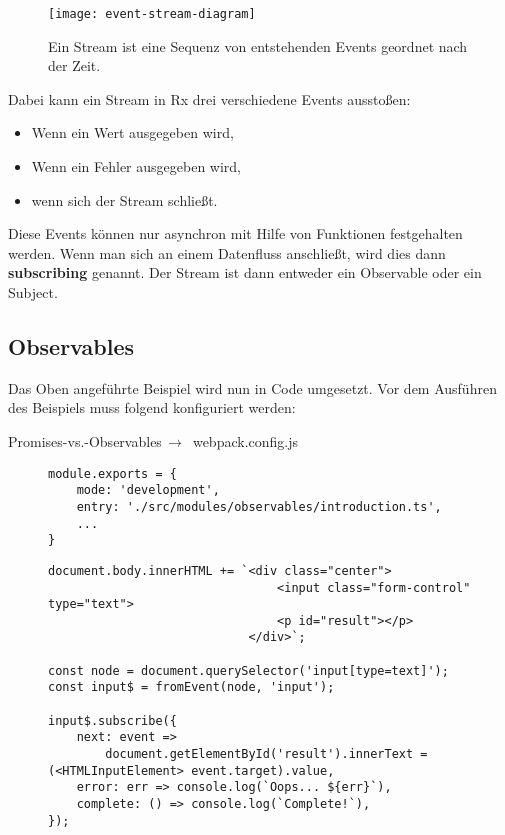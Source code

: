 \begin{figure}[H]
\centering
\texttt{[image: event-stream-diagram]}
\caption{Ein Stream ist eine Sequenz von entstehenden Events geordnet nach der Zeit.}
\end{figure}

\noindent
Dabei kann ein Stream in Rx drei verschiedene Events ausstoßen:

\begin{itemize}
\item Wenn ein Wert ausgegeben wird,
\item Wenn ein Fehler ausgegeben wird,
\item wenn sich der Stream schließt.
\end{itemize}

\noindent
Diese Events können nur asynchron mit Hilfe von Funktionen festgehalten werden. Wenn man sich an einem Datenfluss anschließt, wird dies dann \textbf{subscribing} genannt. Der Stream ist dann entweder ein Observable oder ein Subject. 

\subsection{Observables}
Das Oben angeführte Beispiel wird nun in Code umgesetzt. Vor dem Ausführen des Beispiels muss folgend konfiguriert werden:

 \begin{center}
     Promises-vs.-Observables$\,\to\,$ webpack.config.js
 \end{center}
 
 \begin{figure}[H]
\begin{lstlisting}
module.exports = {
    mode: 'development',
    entry: './src/modules/observables/introduction.ts',
    ...
}
\end{lstlisting}
\end{figure}

 \begin{figure}[H]
\begin{lstlisting}
document.body.innerHTML += `<div class="center">
                                <input class="form-control" type="text">
                                <p id="result"></p>
                            </div>`;

const node = document.querySelector('input[type=text]');
const input$ = fromEvent(node, 'input');

input$.subscribe({
    next: event =>
        document.getElementById('result').innerText = (<HTMLInputElement> event.target).value,
    error: err => console.log(`Oops... ${err}`),
    complete: () => console.log(`Complete!`),
});
\end{lstlisting}
\end{figure}


